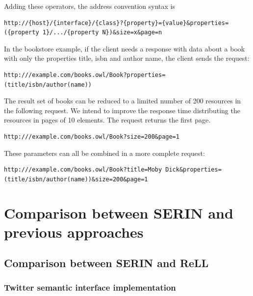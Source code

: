 \documentclass{singlecol-new}
\theoremstyle{TH}{
\newtheorem{lemma}{Lemma}
\newtheorem{theorem}[lemma]{Theorem}
\newtheorem{corrolary}[lemma]{Corrolary}
\newtheorem{conjecture}[lemma]{Conjecture}
\newtheorem{proposition}[lemma]{Proposition}
\newtheorem{claim}[lemma]{Claim}
\newtheorem{stheorem}[lemma]{Wrong Theorem}
\newtheorem{algorithm}{Algorithm}
}
\theoremstyle{THrm}{
\newtheorem{definition}{Definition}[section]
\newtheorem{question}{Question}[section]
\newtheorem{remark}{Remark}
\newtheorem{scheme}{Scheme}
}
\theoremstyle{THhit}{
\newtheorem{case}{Case}[section]
}
\begin{document}
Adding these operators, the address convention syntax is

\begin{lstlisting}[frame=single, basicstyle=\small\ttfamily, breaklines=true]
http://{host}/{interface}/{class}?{property}={value}&properties=({property 1}/.../{property N})&size=x&page=n
\end{lstlisting}

In the bookstore example, if the client needs a response with data about a book with only the properties title, isbn and author name, the client sends the request:  

\begin{lstlisting}[breaklines=true]
http:///example.com/books.owl/Book?properties=(title/isbn/author(name))
\end{lstlisting}

The result set of books can be reduced to a limited number of 200 resources in the following request. We intend to improve the response time distributing the resources in pages of 10 elements. The request returns the first page.

\begin{lstlisting}[breaklines=true]
http:///example.com/books.owl/Book?size=200&page=1
\end{lstlisting}

These parameters can all be combined in a more complete request:

\begin{lstlisting}[breaklines=true]
http:///example.com/books.owl/Book?title=Moby Dick&properties=(title/isbn/author(name))&size=200&page=1
\end{lstlisting}

\section{Comparison between SERIN and previous approaches}
\label{sec:comparison}

\subsection{Comparison between SERIN and ReLL}
\label{sec:rell-implement}

\subsubsection{Twitter semantic interface implementation}
\label{sec:twitter-implement}
\end{document}
